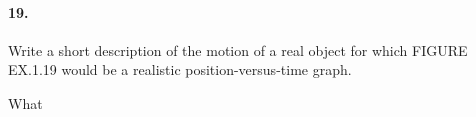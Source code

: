 

\usepackage{graphicx}
\graphicspath{ {./lab0images/} }


\renewcommand\assignment{HW 1, Due Friday, 1/27/2023 23:59; \#19,28,35,40,43,47}



    \iffalse
    \begin{equation*}
        \begin{gathered}
            Equations go here.
        \end{gathered}
    \end{equation*}

    \resizebox{\hsize}{!}{$Long equation goes here$}

    \begin{multicol*}{# of columns}
    \end{multicol*}

    \horizontal

    \fi


    \begin{multicols*}{2}
        \paragraph*{19.}
        Write a short description of the motion of a real object for which FIGURE EX.1.19 would be a realistic position-versus-time graph.

        \begin{mdframed}
            What
        \end{mdframed}
    \end{multicols*}

